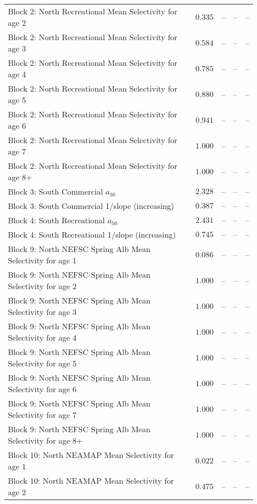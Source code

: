 \documentclass[
]{article}
\begin{document}
\begin{landscape}
\begin{longtable}[t]{lrrrr}
\addlinespace
Block 2: North Recreational Mean Selectivity for age 2 & $0.335$ & -- & -- & --\\
Block 2: North Recreational Mean Selectivity for age 3 & $0.584$ & -- & -- & --\\
Block 2: North Recreational Mean Selectivity for age 4 & $0.785$ & -- & -- & --\\
Block 2: North Recreational Mean Selectivity for age 5 & $0.880$ & -- & -- & --\\
Block 2: North Recreational Mean Selectivity for age 6 & $0.941$ & -- & -- & --\\
\addlinespace
Block 2: North Recreational Mean Selectivity for age 7 & $1.000$ & -- & -- & --\\
Block 2: North Recreational Mean Selectivity for age 8+ & $1.000$ & -- & -- & --\\
Block 3: South Commercial $a_{50}$ & $2.328$ & -- & -- & --\\
Block 3: South Commercial 1/slope (increasing) & $0.387$ & -- & -- & --\\
Block 4: South Recreational $a_{50}$ & $2.431$ & -- & -- & --\\
\addlinespace
Block 4: South Recreational 1/slope (increasing) & $0.745$ & -- & -- & --\\
Block 9: North NEFSC Spring Alb Mean Selectivity for age 1 & $0.086$ & -- & -- & --\\
Block 9: North NEFSC Spring Alb Mean Selectivity for age 2 & $1.000$ & -- & -- & --\\
Block 9: North NEFSC Spring Alb Mean Selectivity for age 3 & $1.000$ & -- & -- & --\\
Block 9: North NEFSC Spring Alb Mean Selectivity for age 4 & $1.000$ & -- & -- & --\\
\addlinespace
Block 9: North NEFSC Spring Alb Mean Selectivity for age 5 & $1.000$ & -- & -- & --\\
Block 9: North NEFSC Spring Alb Mean Selectivity for age 6 & $1.000$ & -- & -- & --\\
Block 9: North NEFSC Spring Alb Mean Selectivity for age 7 & $1.000$ & -- & -- & --\\
Block 9: North NEFSC Spring Alb Mean Selectivity for age 8+ & $1.000$ & -- & -- & --\\
Block 10: North NEAMAP Mean Selectivity for age 1 & $0.022$ & -- & -- & --\\
\addlinespace
Block 10: North NEAMAP Mean Selectivity for age 2 & $0.475$ & -- & -- & --\\

\end{longtable}
\end{landscape}
\end{document}
